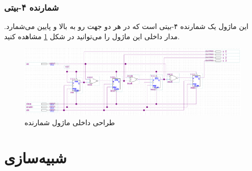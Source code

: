 \documentclass[12pt,onecolumn,a4paper,fleqn]{article}
\begin{document}
	\subsubsection{شمارنده ۴-بیتی}
	این ماژول یک شمارنده ۴-بیتی است که در هر دو جهت رو به بالا و پایین می‌شمارد. مدار داخلی این ماژول را می‌توانید در شکل \ref{fig:counter} مشاهده کنید.
	\begin{figure}[H]
		\centering
		\includegraphics[scale=0.4]{source/counter.png}
		\caption{طراحی داخلی ماژول شمارنده}
		\label{fig:counter}
	\end{figure}
 	
 	\pagebreak
 	\section{شبیه‌سازی}
 	
\end{document}
